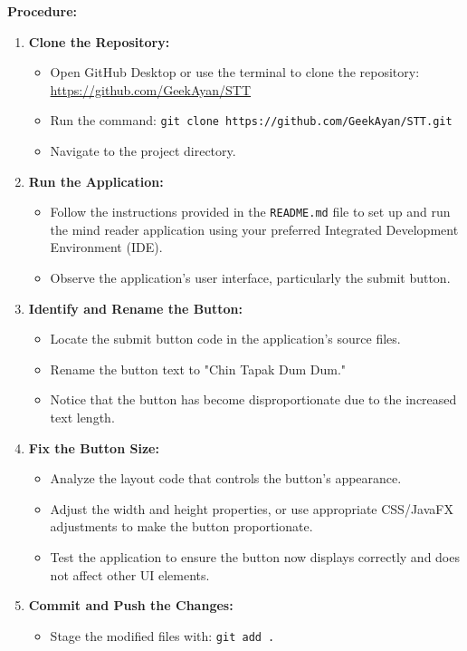 \documentclass{article}
\begin{document}
\textbf{Procedure:}
\begin{enumerate}
    \item \textbf{Clone the Repository:}
    \begin{itemize}
        \item Open GitHub Desktop or use the terminal to clone the repository: \url{https://github.com/GeekAyan/STT}
        \item Run the command: \texttt{git clone https://github.com/GeekAyan/STT.git}
        \item Navigate to the project directory.
    \end{itemize}
    \item \textbf{Run the Application:}
    \begin{itemize}
        \item Follow the instructions provided in the \texttt{README.md} file to set up and run the mind reader application using your preferred Integrated Development Environment (IDE).
        \item Observe the application’s user interface, particularly the submit button.
    \end{itemize}
    \item \textbf{Identify and Rename the Button:}
    \begin{itemize}
        \item Locate the submit button code in the application’s source files.
        \item Rename the button text to "Chin Tapak Dum Dum."
        \item Notice that the button has become disproportionate due to the increased text length.
    \end{itemize}
    \item \textbf{Fix the Button Size:}
    \begin{itemize}
        \item Analyze the layout code that controls the button’s appearance.
        \item Adjust the width and height properties, or use appropriate CSS/JavaFX adjustments to make the button proportionate.
        \item Test the application to ensure the button now displays correctly and does not affect other UI elements.
    \end{itemize}
    \item \textbf{Commit and Push the Changes:}
    \begin{itemize}
        \item Stage the modified files with: \texttt{git add .}

\end{itemize}
\end{enumerate}
\end{document}
